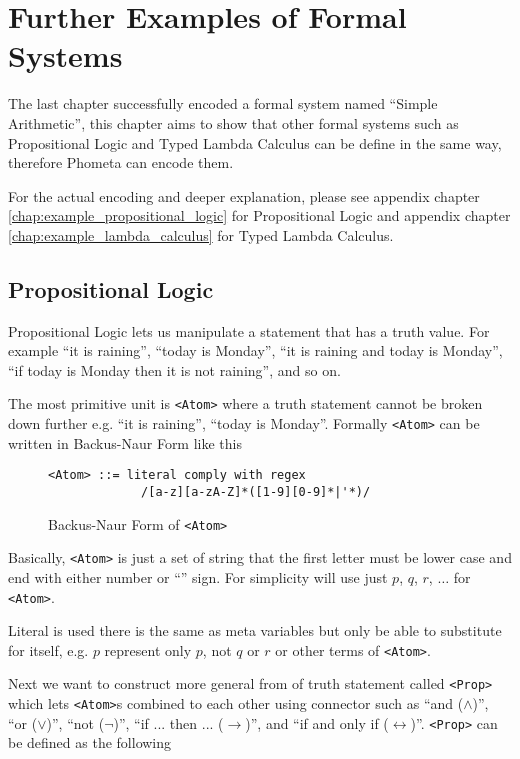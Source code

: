 \documentclass[master.tex]{subfiles}
\begin{document}
\chapter{Further Examples of Formal Systems}
\label{chap:examples_formal_systems}

The last chapter successfully encoded a formal system named ``Simple
Arithmetic'', this chapter aims to show that other formal systems such as
Propositional Logic and Typed Lambda Calculus can be define in the same way,
therefore Phometa can encode them.

For the actual encoding and deeper explanation, please see appendix chapter
\ref{chap:example_propositional_logic} for Propositional Logic and appendix
chapter \ref{chap:example_lambda_calculus} for Typed Lambda Calculus.

\section{Propositional Logic}

Propositional Logic lets us manipulate a statement that has a truth value. For
example ``it is raining'', ``today is Monday'', ``it is raining and today is
Monday'', ``if today is Monday then it is not raining'', and so on.

The most primitive unit is \texttt{<Atom>} where a truth statement cannot be
broken down further e.g. ``it is raining'', ``today is Monday''. Formally
\texttt{<Atom>} can be written in Backus-Naur Form like this

\begin{figure}[H]
\begin{framed}
\begin{lstlisting}[style=bnf]
<Atom> ::= literal comply with regex
             /[a-z][a-zA-Z]*([1-9][0-9]*|'*)/
\end{lstlisting}
\end{framed}
\caption{Backus-Naur Form of \texttt{<Atom>}}
\end{figure}

Basically, \texttt{<Atom>} is just a set of string that the first letter must be
lower case and end with either number or ``\textquotesingle'' sign. For
simplicity will use just $p$, $q$, $r$, $\ldots$ for \texttt{<Atom>}.

Literal is used there is the same as meta variables but only be able to
substitute for itself, e.g. $p$ represent only $p$, not $q$ or $r$ or other
terms of \texttt{<Atom>}.

Next we want to construct more general from of truth statement called
\texttt{<Prop>} which lets \texttt{<Atom>}s combined to each other using
connector such as ``and ($\wedge$)'', ``or ($\vee$)'', ``not ($\neg$)'', ``if
... then ... ($\rightarrow$)'', and ``if and only if ($\leftrightarrow$)''.
\texttt{<Prop>} can be defined as the following
\end{document}
